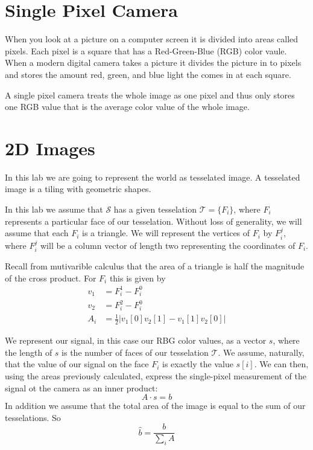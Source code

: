\label{lab:SPC}


\section*{Single Pixel Camera}
When you look at a picture on a computer screen it is divided into areas called pixels. Each pixel is a square that has a Red-Green-Blue (RGB) color vaule. When a  modern digital camera takes a picture it divides the picture in to pixels and stores the amount red, green, and blue light the comes in at each square.

A single pixel camera treats the whole image as one pixel and thus only stores one RGB value that is the average color value of the whole image.  

\section*{2D Images}
In this lab we are going to represent the world as tesselated image. A tesselated image is a tiling with geometric shapes. 

In this lab we assume that $\mathcal{S}$ has a given tesselation $\mathcal{T} = \{F_i\}$, where $F_i$ represents a particular face of our tesselation. Without loss of generality, we will assume that each $F_i$ is a triangle. We will represent the vertices of $F_i$ by $F^j_i$, where $F^j_i$ will be a column vector of length two representing the coordinates of $F_i$.

Recall from mutivarible calculus that the area of a triangle is half the magnitude of the cross product. For $F_i$ this is given by
\begin{align}
v_1 &= F_i^1 - F_i^0 \\
v_2 &= F_i^2 - F_i^0 \\
A_i &= \frac{1}{2}\big|v_1[0] v_2[1] - v_1[1] v_2[0]\big|
\end{align}


We represent our signal, in this case our RBG color values, as a vector $s$, where the length of $s$ is the number of faces of our tesselation $\mathcal{T}$. We assume, naturally, that the value of our signal  on the face $F_i$ is exactly the value $s[i]$. We can then, using the areas previously calculated, express the single-pixel measurement of the signal ot the camera as an inner product:
\begin{equation}
A \cdot s = b
\end{equation}
In addition we assume that the total area of the image is equal to the sum of our tesselations. So  
\begin{equation}
\hat{b} = \frac{b}{\sum_i A}
\end{equation}

